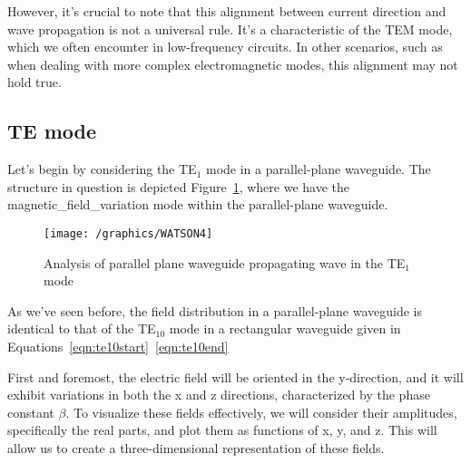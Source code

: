 However, it's crucial to note that this alignment between current direction and wave propagation is not a universal rule. It's a characteristic of the TEM mode, which we often encounter in low-frequency circuits. In other scenarios, such as when dealing with more complex electromagnetic modes, this alignment may not hold true.

\subsection{TE mode}
Let's begin by considering the TE$_1$ mode in a parallel-plane waveguide. The structure in question is depicted Figure~\ref{fig:watson4}, where we have the magnetic_field_variation mode within the parallel-plane waveguide.
\begin{figure}[h]
\centering
\texttt{[image: /graphics/WATSON4]}
\caption{Analysis of parallel plane waveguide propagating wave in the TE$_1$ mode}
\label{fig:watson4}
\end{figure}

As we've seen before, the field distribution in a parallel-plane waveguide is identical to that of the TE$_{10}$ mode in a rectangular waveguide given in Equations~\eqref{eqn:te10start}\textemdash~\eqref{eqn:te10end}

First and foremost, the electric field will be oriented in the y-direction, and it will exhibit variations in both the x and z directions, characterized by the phase constant \(\beta\). To visualize these fields effectively, we will consider their amplitudes, specifically the real parts, and plot them as functions of x, y, and z. This will allow us to create a three-dimensional representation of these fields.

